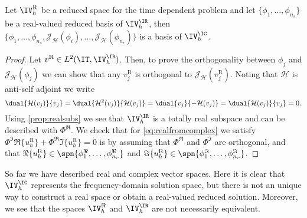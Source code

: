 \begin{corollary} \label{cor:j-basis}
    Let $\IV_h^{\textrm{R}}$ be a reduced space for the time dependent problem and let $\{\phi_1,\dots,\phi_{n_s}\}$ be a real-valued reduced basis of $\IV_h^\IR$, then $\{\phi_1,\dots,\phi_{n_s},\mathcal{J}_{\mathcal{H}}(\phi_i),\ldots,\mathcal{J}_{\mathcal{H}}(\phi_{n_r})\}$ is a basis of $\IV_h^\IC$.
\end{corollary}
\begin{proof}
    Let $v^{\textrm{R}} \in L^2(\IT,\IV_h^\IR)$. Then, to prove the orthogonality between $\phi_j$ and $\mathcal{J}_{\mathcal{H}}(\phi_j)$ we can show that any $v^{\textrm{R}}_j$ is orthogonal to $\mathcal{J}_{\mathcal{H}}(v^{\textrm{R}}_j)$. Noting that $\mathcal{H}$ is anti-self adjoint we write
    \begin{equation}
        \dual{\mathcal{H}(v_j)}{v_j} = \dual{\mathcal{H}^2(v_j)}{\mathcal{H}(v_j)} = \dual{v_j}{-\mathcal{H}(v_j)} = \dual{\mathcal{H}(v_j)}{v_j} =0.
    \end{equation}
    Using \cref{prop:realsubs} we see that $\IV_h^\IR$ is a totally real subspace and can be described with $\Phi^\Re$. We check that for \cref{eq:realfromcomplex} we satisfy $\Phi^\Im \Re \{ u_h^{\textrm{R}} \} + \Phi^\Re \Im \{ u_h^{\textrm{R}} \} =0$ is by assuming that $\Phi^\Re$ and $\Phi^\Im$ are orthogonal, and that $\Re \{ u_h^{\textrm{R}} \} \in \spn \{ \phi_1^\Re, \ldots, \phi_{n_r}^\Re \}$ and $\Im \{ u_h^{\textrm{R}} \} \in \spn \{ \phi_1^\Im, \ldots, \phi_{n_r}^\Im \}$.
\end{proof}

So far we have described real and complex vector spaces. Here it is clear that $\IV_h^\IC$ represents the frequency-domain solution space, but there is not an unique way to construct a real space or obtain a real-valued reduced solution. Moreover, we see that the spaces $\IV_h^\Re$ and $\IV_h^\IR$ are not necessarily equivalent.

